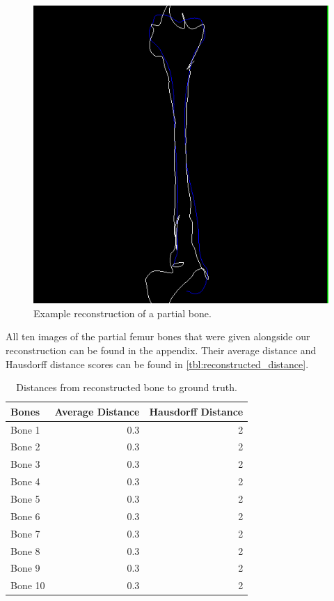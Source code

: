 \begin{figure}
	\centering
  \includegraphics[scale=0.7]{./Figures/reconstructed_bone}
  \caption{Example reconstruction of a partial bone.}
  \label{fig:reconstructed_bone}
\end{figure}

All ten images of the partial femur bones that were given alongside our reconstruction can be found in the appendix. 
Their average distance and Hausdorff distance scores can be found in \autoref{tbl:reconstructed_distance}.

\begin{table}
\centering
\caption{Distances from reconstructed bone to ground truth.}
\label{tbl:reconstructed_distance}
\begin{tabular}{lrr}
\toprule
\textbf{Bones} &
Average Distance &
Hausdorff Distance \\
\midrule
Bone 1& 0.3 & 2 \\
Bone 2& 0.3 & 2 \\
Bone 3& 0.3 & 2 \\
Bone 4& 0.3 & 2 \\
Bone 5& 0.3 & 2 \\
Bone 6& 0.3 & 2 \\
Bone 7& 0.3 & 2 \\
Bone 8& 0.3 & 2 \\
Bone 9& 0.3 & 2 \\
Bone 10& 0.3 & 2 \\
\bottomrule
\end{tabular}
\end{table}